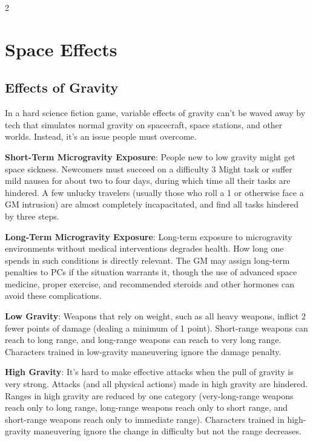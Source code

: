 \begin{multicols}{2}

\chapter{Space Effects}

\section{Effects of Gravity}

In a hard science fiction game, variable effects of gravity can’t be waved away by tech that simulates normal gravity on spacecraft, space stations, and other worlds. Instead, it’s an issue people must overcome. 

\textbf{Short-Term Microgravity Exposure}: People new to low gravity might get space sickness. Newcomers must succeed on a difficulty 3 Might task or suffer mild nausea for about two to four days, during which time all their tasks are hindered. A few unlucky travelers (usually those who roll a 1 or otherwise face a GM intrusion) are almost completely incapacitated, and find all tasks hindered by three steps.

\textbf{Long-Term Microgravity Exposure}: Long-term exposure to microgravity environments without medical interventions degrades health. How long one spends in such conditions is directly relevant. The GM may assign long-term penalties to PCs if the situation warrants it, though the use of advanced space medicine, proper exercise, and recommended steroids and other hormones can avoid these complications.

\textbf{Low Gravity}: Weapons that rely on weight, such as all heavy weapons, inflict 2 fewer points of damage (dealing a minimum of 1 point). Short-range weapons can reach to long range, and long-range weapons can reach to very long range. Characters trained in low-gravity maneuvering ignore the damage penalty.

\textbf{High Gravity}: It’s hard to make effective attacks when the pull of gravity is very strong. Attacks (and all physical actions) made in high gravity are hindered. Ranges in high gravity are reduced by one category (very-long-range weapons reach only to long range, long-range weapons reach only to short range, and
short-range weapons reach only to immediate range). Characters trained in high-gravity maneuvering ignore the change in difficulty but not the range decreases.


\end{multicols}
